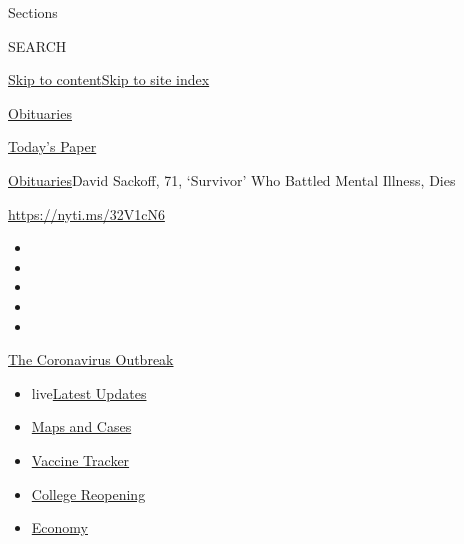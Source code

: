 Sections

SEARCH

\protect\hyperlink{site-content}{Skip to
content}\protect\hyperlink{site-index}{Skip to site index}

\href{https://www.nytimes3xbfgragh.onion/section/obituaries}{Obituaries}

\href{https://myaccount.nytimes3xbfgragh.onion/auth/login?response_type=cookie\&client_id=vi}{}

\href{https://www.nytimes3xbfgragh.onion/section/todayspaper}{Today's
Paper}

\href{/section/obituaries}{Obituaries}\textbar{}David Sackoff, 71,
`Survivor' Who Battled Mental Illness, Dies

\url{https://nyti.ms/32V1cN6}

\begin{itemize}
\item
\item
\item
\item
\item
\end{itemize}

\href{https://www.nytimes3xbfgragh.onion/news-event/coronavirus?action=click\&pgtype=Article\&state=default\&region=TOP_BANNER\&context=storylines_menu}{The
Coronavirus Outbreak}

\begin{itemize}
\tightlist
\item
  live\href{https://www.nytimes3xbfgragh.onion/2020/08/04/world/coronavirus-covid-19.html?action=click\&pgtype=Article\&state=default\&region=TOP_BANNER\&context=storylines_menu}{Latest
  Updates}
\item
  \href{https://www.nytimes3xbfgragh.onion/interactive/2020/us/coronavirus-us-cases.html?action=click\&pgtype=Article\&state=default\&region=TOP_BANNER\&context=storylines_menu}{Maps
  and Cases}
\item
  \href{https://www.nytimes3xbfgragh.onion/interactive/2020/science/coronavirus-vaccine-tracker.html?action=click\&pgtype=Article\&state=default\&region=TOP_BANNER\&context=storylines_menu}{Vaccine
  Tracker}
\item
  \href{https://www.nytimes3xbfgragh.onion/2020/08/02/us/covid-college-reopening.html?action=click\&pgtype=Article\&state=default\&region=TOP_BANNER\&context=storylines_menu}{College
  Reopening}
\item
  \href{https://www.nytimes3xbfgragh.onion/live/2020/08/03/business/stock-market-today-coronavirus?action=click\&pgtype=Article\&state=default\&region=TOP_BANNER\&context=storylines_menu}{Economy}
\end{itemize}

